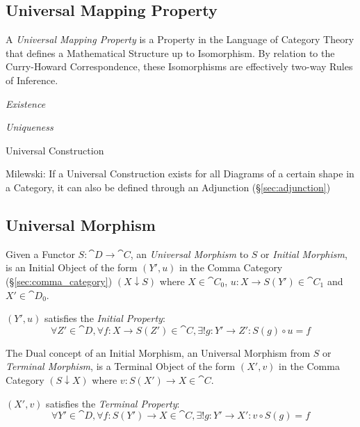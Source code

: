 \subsection{Universal Mapping Property}
\label{sec:universal_mapping_property}

A \emph{Universal Mapping Property} is a Property in the Language of
Category Theory that defines a Mathematical Structure up to
Isomorphism. By relation to the Curry-Howard Correspondence, these
Isomorphisms are effectively two-way Rules of Inference.

\emph{Existence}

\emph{Uniqueness}

Universal Construction

Milewski: If a Universal Construction exists for all Diagrams of a
certain shape in a Category, it can also be defined through an
Adjunction (\S\ref{sec:adjunction})



\subsection{Universal Morphism}\label{sec:universal_morphism}

Given a Functor $S: \cat{D} \rightarrow \cat{C}$, an
\emph{Universal Morphism} to $S$ or \emph{Initial Morphism}, is an
Initial Object of the form $(Y',u)$ in the Comma Category
(\S\ref{sec:comma_category}) $(X \downarrow S)$ where $X \in
\cat{C}_0$, $u : X \rightarrow S(Y') \in \cat{C}_1$ and $X' \in
\cat{D}_0$.

$(Y', u)$ satisfies the \emph{Initial Property}:
\[
  \forall Z' \in \cat{D}, \forall f : X \rightarrow S(Z') \in
  \cat{C}, \exists! g : Y' \rightarrow Z' : S(g) \circ u = f
\]

The Dual concept of an Initial Morphism, an Universal Morphism from
$S$ or \emph{Terminal Morphism}, is a Terminal Object of the form
$(X',v)$ in the Comma Category $(S \downarrow X)$ where $v : S(X')
\rightarrow X \in \cat{C}$.

$(X',v)$ satisfies the \emph{Terminal Property}:
\[
  \forall Y' \in \cat{D}, \forall f : S(Y') \rightarrow X \in
  \cat{C}, \exists! g : Y' \rightarrow X' : v \circ S(g) = f
\]




